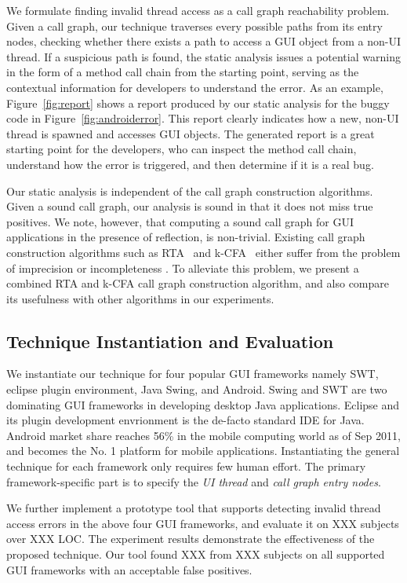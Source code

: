 We formulate finding invalid thread access as a call graph reachability
problem. Given a call graph, our technique traverses
every possible paths from its entry nodes, checking whether
there exists a path to access a GUI object from a non-UI thread. If 
a suspicious path is found,
the static analysis issues a potential warning in the form of a method
call chain from the starting point, serving as the contextual information
for developers to understand the error.
As an example, Figure~\ref{fig:report} shows a report produced
by our static analysis for the buggy code in Figure~\ref{fig:androiderror}.
This report clearly indicates how a new, non-UI thread is spawned and
accesses GUI objects. 
The generated report is a great starting point for the developers, who can
inspect the method call chain, understand how the error
is triggered, and then determine if it is a real bug.

Our static analysis is independent of the call graph construction algorithms.
Given a sound call graph, our analysis is sound in that it does
not miss true positives. We note, however, that computing a sound
call graph for GUI applications in the presence of reflection,
is non-trivial.
Existing call graph construction algorithms such as RTA~\cite{} and k-CFA~\cite{}
either suffer from the problem of imprecision or incompleteness .
To alleviate this problem,
we present a combined RTA and k-CFA call graph construction algorithm, and
also compare its usefulness with other algorithms in  our experiments.

\subsection{Technique Instantiation and Evaluation}


We instantiate our technique for four popular GUI frameworks namely SWT,
eclipse plugin environment, Java Swing, and Android. Swing and SWT are
two dominating GUI frameworks in developing desktop Java applications.
Eclipse and its plugin development envrionment is the de-facto standard
IDE for Java. Android market share reaches 56\% in the mobile computing
world as of Sep 2011, and becomes the No. 1 platform for mobile applications.
Instantiating the general technique for each framework only requires few
human effort. The primary framework-specific part is to specify
the \textit{UI thread} and \textit{call graph entry nodes}.

We further implement a prototype tool that supports detecting invalid
thread access errors in the above four GUI frameworks, and evaluate
it on XXX subjects over XXX LOC. The experiment results demonstrate
the effectiveness of the proposed technique. Our tool found XXX
from XXX subjects on all supported GUI frameworks with an acceptable
false positives.




